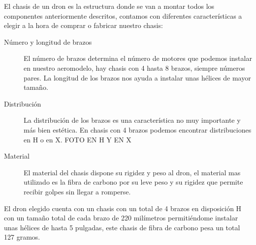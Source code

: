 
	El chasis de un dron es la estructura donde se van a montar todos los componentes anteriormente descritos, contamos con diferentes características a elegir a la hora de comprar o fabricar nuestro chasis:
	
	\begin{description}
	\item[Número y longitud de brazos] El número de brazos determina el número de motores que podemos instalar en nuestro aeromodelo, hay chasis con 4 hasta 8 brazos, siempre números pares.
	La longitud de los brazos nos ayuda a instalar unas hélices de mayor tamaño.
	\item[Distribución] La distribución de los brazos es una característica no muy importante y más bien estética. En chasis con 4 brazos podemos encontrar distribuciones en H o en X.
	FOTO EN H Y EN X
	\item[Material] El material del chasis dispone su rigidez y peso al dron, el material mas utilizado es la fibra de carbono por su leve peso y su rigidez que permite recibir golpes sin llegar a romperse.
	\end{description}
	
	El dron elegido cuenta con un chasis con un total de 4 brazos en disposición H con un tamaño total de cada brazo de 220 milímetros permitiéndome instalar unas hélices de hasta 5 pulgadas, este chasis de fibra de carbono pesa un total 127 gramos.
	
	
